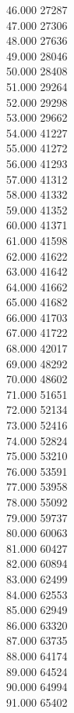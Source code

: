 { 46.000	27287 \\
 47.000	27306 \\
 48.000	27636 \\
 49.000	28046 \\
 50.000	28408 \\
 51.000	29264 \\
 52.000	29298 \\
 53.000	29662 \\
 54.000	41227 \\
 55.000	41272 \\
 56.000	41293 \\
 57.000	41312 \\
 58.000	41332 \\
 59.000	41352 \\
 60.000	41371 \\
 61.000	41598 \\
 62.000	41622 \\
 63.000	41642 \\
 64.000	41662 \\
 65.000	41682 \\
 66.000	41703 \\
 67.000	41722 \\
 68.000	42017 \\
 69.000	48292 \\
 70.000	48602 \\
 71.000	51651 \\
 72.000	52134 \\
 73.000	52416 \\
 74.000	52824 \\
 75.000	53210 \\
 76.000	53591 \\
 77.000	53958 \\
 78.000	55092 \\
 79.000	59737 \\
 80.000	60063 \\
 81.000	60427 \\
 82.000	60894 \\
 83.000	62499 \\
 84.000	62553 \\
 85.000	62949 \\
 86.000	63320 \\
 87.000	63735 \\
 88.000	64174 \\
 89.000	64524 \\
 90.000	64994 \\
 91.000	65402 \\
}
